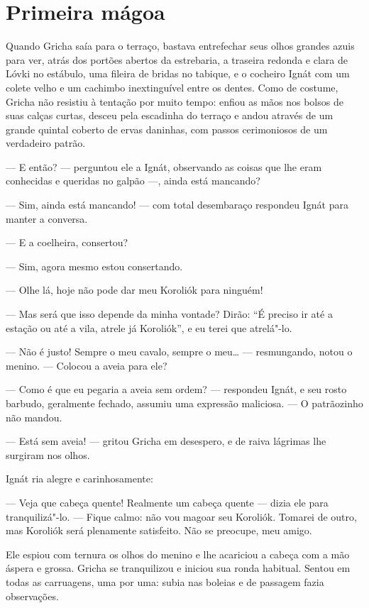 \chapter{Primeira mágoa}

Quando Gricha saía para o terraço, bastava entrefechar seus olhos
grandes azuis para ver, atrás dos portões abertos da estrebaria, a
traseira redonda e clara de Lóvki no estábulo, uma fileira de bridas no
tabique, e o cocheiro Ignát com um colete velho e um cachimbo
inextinguível entre os dentes. Como de costume, Gricha não resistiu à
tentação por muito tempo: enfiou as mãos nos bolsos de suas calças
curtas, desceu pela escadinha do terraço e andou através de um grande
quintal coberto de ervas daninhas, com passos cerimoniosos de um
verdadeiro patrão.

--- E então? --- perguntou ele a Ignát, observando as coisas que lhe
eram conhecidas e queridas no galpão ---, ainda está mancando?

--- Sim, ainda está mancando! --- com total desembaraço respondeu Ignát
para manter a conversa.

--- E a coelheira, consertou?

--- Sim, agora mesmo estou consertando.

--- Olhe lá, hoje não pode dar meu Koroliók para ninguém!

--- Mas será que isso depende da minha vontade? Dirão: ``É preciso ir
até a estação ou até a vila, atrele já Koroliók'', e eu terei que
atrelá"-lo.

--- Não é justo! Sempre o meu cavalo, sempre o meu\ldots{} --- resmungando,
notou o menino. --- Colocou a aveia para ele?

--- Como é que eu pegaria a aveia sem ordem? --- respondeu Ignát, e seu
rosto barbudo, geralmente fechado, assumiu uma expressão maliciosa. ---
O patrãozinho não mandou.

--- Está sem aveia! --- gritou Gricha em desespero, e de raiva lágrimas
lhe surgiram nos olhos.

Ignát ria alegre e carinhosamente:

--- Veja que cabeça quente! Realmente um cabeça quente --- dizia ele
para tranquilizá"-lo. --- Fique calmo: não vou magoar seu Koroliók.
Tomarei de outro, mas Koroliók será plenamente satisfeito. Não se
preocupe, meu amigo.

Ele espiou com ternura os olhos do menino e lhe acariciou a cabeça com a
mão áspera e grossa. Gricha se tranquilizou e iniciou sua ronda
habitual. Sentou em todas as carruagens, uma por uma: subia nas boleias
e de passagem fazia observações.

